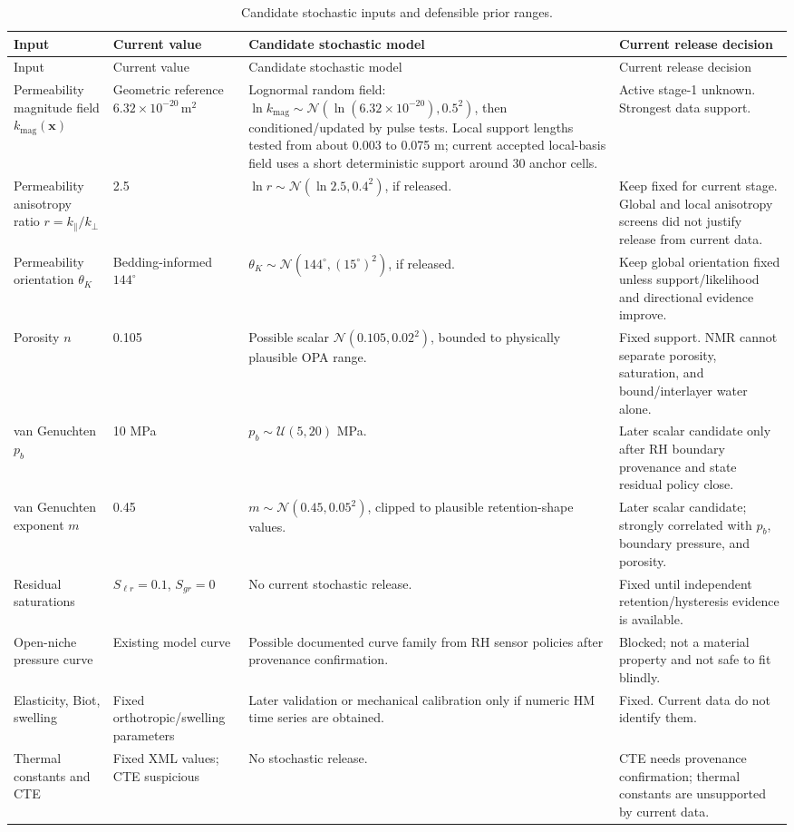 \documentclass[10pt,a4paper]{article}
\newcommand{\npor}{n}
\begin{document}
\begin{longtable}{@{}L{0.21\textwidth}L{0.2\textwidth}L{0.2\textwidth}Y@{}}
\caption{Candidate stochastic inputs and defensible prior ranges.}
\label{tab:stochastic}\\
\toprule
Input & Current value & Candidate stochastic model & Current release decision \\
\midrule
\endfirsthead
\toprule
Input & Current value & Candidate stochastic model & Current release decision \\
\midrule
\endhead
\bottomrule
\endlastfoot
Permeability magnitude field \(k_{\mathrm{mag}}(\bm x)\) & Geometric reference \(6.32\times10^{-20}\,\mathrm{m^2}\) & Lognormal random field:
\(\ln k_{\mathrm{mag}}\sim\mathcal N(\ln(6.32\times10^{-20}),0.5^2)\), then conditioned/updated by pulse tests.  Local support lengths tested from about 0.003 to 0.075 m; current accepted local-basis field uses a short deterministic support around 30 anchor cells. & Active stage-1 unknown.  Strongest data support. \\
Permeability anisotropy ratio \(r=k_\parallel/k_\perp\) & 2.5 & \(\ln r\sim\mathcal N(\ln 2.5,0.4^2)\), if released. & Keep fixed for current stage.  Global and local anisotropy screens did not justify release from current data. \\
Permeability orientation \(\theta_K\) & Bedding-informed \(144^\circ\) & \(\theta_K\sim\mathcal N(144^\circ,(15^\circ)^2)\), if released. & Keep global orientation fixed unless support/likelihood and directional evidence improve. \\
Porosity \(\npor\) & 0.105 & Possible scalar \(\mathcal N(0.105,0.02^2)\), bounded to physically plausible OPA range. & Fixed support.  NMR cannot separate porosity, saturation, and bound/interlayer water alone. \\
van Genuchten \(p_b\) & 10 MPa & \(p_b\sim\mathcal U(5,20)\) MPa. & Later scalar candidate only after RH boundary provenance and state residual policy close. \\
van Genuchten exponent \(m\) & 0.45 & \(m\sim\mathcal N(0.45,0.05^2)\), clipped to plausible retention-shape values. & Later scalar candidate; strongly correlated with \(p_b\), boundary pressure, and porosity. \\
Residual saturations & \(S_{\ell r}=0.1\), \(S_{gr}=0\) & No current stochastic release. & Fixed until independent retention/hysteresis evidence is available. \\
Open-niche pressure curve & Existing model curve & Possible documented curve family from RH sensor policies after provenance confirmation. & Blocked; not a material property and not safe to fit blindly. \\
Elasticity, Biot, swelling & Fixed orthotropic/swelling parameters & Later validation or mechanical calibration only if numeric HM time series are obtained. & Fixed.  Current data do not identify them. \\
Thermal constants and CTE & Fixed XML values; CTE suspicious & No stochastic release. & CTE needs provenance confirmation; thermal constants are unsupported by current data. \\
\end{longtable}
\end{document}
